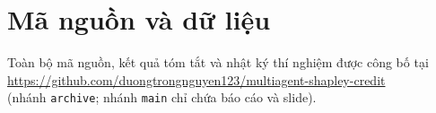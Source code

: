 \documentclass[11pt,a4paper]{article}
\begin{document}
\appendix
\section*{Mã nguồn và dữ liệu}
Toàn bộ mã nguồn, kết quả tóm tắt và nhật ký thí nghiệm được công bố tại\\
\url{https://github.com/duongtrongnguyen123/multiagent-shapley-credit}\\
(nhánh \texttt{archive}; nhánh \texttt{main} chỉ chứa báo cáo và slide).
\end{document}
